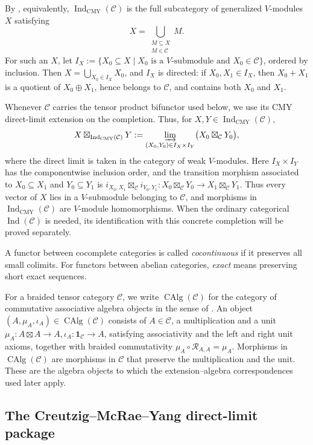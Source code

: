 \documentclass[12pt,leqno]{amsart}
\numberwithin{equation}{section} \newtheorem{thm}{Theorem}[section] \newtheorem{lem}[thm]{Lemma} \newtheorem{ex}[thm]{Example} \newtheorem{prop}[thm]{Proposition} \newtheorem{cor}[thm]{Corollary} \newtheorem{defi}[thm]{Definition} \newtheorem{rmk}[thm]{Remark} \newtheorem{notation}[thm]{Notation}
\newcommand{\CAlg}{\operatorname{CAlg}}
\newcommand{\IndCMY}{\operatorname{Ind}_{\mathrm{CMY}}}
\begin{document}
By \cite[Proposition~4.6]{CMY}, equivalently, \(\IndCMY(\mathcal C)\) is the full subcategory of generalized $V$-modules $X$ satisfying
\[
X=\bigcup_{\substack{M\subseteq X\\ M\in\mathcal C}}M.
\]
For such an $X$, let \(I_X:=\{X_0\subseteq X\mid X_0\text{ is a $V$-submodule and }X_0\in\mathcal C\}\), ordered by inclusion. Then $X=\bigcup_{X_0\in I_X}X_0$, and $I_X$ is directed: if $X_0,X_1\in I_X$, then $X_0+X_1$ is a quotient of $X_0\oplus X_1$, hence belongs to $\mathcal C$, and contains both $X_0$ and $X_1$.

Whenever $\mathcal C$ carries the tensor product bifunctor used below, we use its CMY direct-limit extension on the completion. Thus, for $X,Y\in\IndCMY(\mathcal C)$,
\[
X\boxtimes_{\IndCMY(\mathcal C)}Y:=\varinjlim_{(X_0,Y_0)\in I_X\times I_Y}\bigl(X_0\boxtimes_{\mathcal C}Y_0\bigr),
\]
where the direct limit is taken in the category of weak $V$-modules. Here $I_X\times I_Y$ has the componentwise inclusion order, and the transition morphism associated to $X_0\subseteq X_1$ and $Y_0\subseteq Y_1$ is \(i_{X_0,X_1}\boxtimes_{\mathcal C}i_{Y_0,Y_1}: X_0\boxtimes_{\mathcal C}Y_0\longrightarrow X_1\boxtimes_{\mathcal C}Y_1\). Thus every vector of $X$ lies in a $V$-submodule belonging to $\mathcal C$, and morphisms in $\IndCMY(\mathcal C)$ are $V$-module homomorphisms. When the ordinary categorical $\operatorname{Ind}(\mathcal C)$ is needed, its identification with this concrete completion will be proved separately.

A functor between cocomplete categories is called \emph{cocontinuous} if it preserves all small colimits. For functors between abelian categories, \emph{exact} means preserving short exact sequences.

For a braided tensor category $\mathcal C$, we write $\CAlg(\mathcal C)$ for the category of commutative associative algebra objects in the sense of \cite[Definition~7.4]{CMY}. An object \((A,\mu_A,\iota_A)\in\CAlg(\mathcal C)\) consists of $A\in\mathcal C$, a multiplication and a unit \(\mu_A:A\boxtimes A\longrightarrow A,\iota_A:\mathbf 1_{\mathcal C}\longrightarrow A\), satisfying associativity and the left and right unit axioms, together with braided commutativity \(\mu_A\circ\mathcal R_{A,A}=\mu_A.\) Morphisms in $\CAlg(\mathcal C)$ are morphisms in $\mathcal C$ that preserve the multiplication and the unit. These are the algebra objects to which the extension--algebra correspondences used later apply.

\subsection{The Creutzig--McRae--Yang direct-limit package}
\label{subsec:CMY-package}
\end{document}

